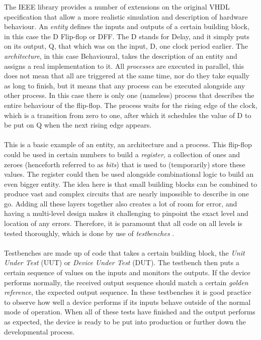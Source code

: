 \documentclass[11pt,british]{article}
\begin{document}
The IEEE library provides a number of extensions on the original VHDL specification that allow a more realistic simulation and description of hardware behaviour. An \emph{entity} defines the inputs and outputs of a certain building block, in this case the D Flip-flop or DFF. The D stands for Delay, and it simply puts on its output, Q, that which was on the input, D, one clock period earlier. The \emph{architecture}, in this case Behavioural, takes the description of an entity and assigns a real implementation to it. All \emph{processes} are executed in parallel, this does not mean that all are triggered at the same time, nor do they take equally as long to finish, but it means that any process can be executed alongside any other process. In this case there is only one (nameless) process that describes the entire behaviour of the flip-flop. The process waits for the rising edge of the clock, which is a transition from zero to one, after which it schedules the value of D to be put on Q when the next rising edge appears.
\\
\\
This is a basic example of an entity, an architecture and a process. This flip-flop could be used in certain numbers to build a \emph{register}, a collection of ones and zeroes (henceforth referred to as \emph{bits}) that is used to (temporarily) store these values. The register could then be used alongside combinational logic to build an even bigger entity. The idea here is that small building blocks can be combined to produce vast and complex circuits that are nearly impossible to describe in one go. Adding all these layers together also creates a lot of room for error, and having a multi-level design makes it challenging to pinpoint the exact level and location of any errors. Therefore, it is paramount that all code on all levels is tested thoroughly, which is done by use of \emph{testbenches} \cite{key-2}.
\\
\\
Testbenches are made up of code that takes a certain building block, the \emph{Unit Under Test} (UUT) or \emph{Device Under Test} (DUT). The testbench then puts a certain sequence of values on the inputs and monitors the outputs. If the device performs normally, the received output sequence should match a certain \emph{golden reference}, the expected output sequence. In these testbenches it is good practice to observe how well a device performs if its inputs behave outside of the normal mode of operation. When all of these tests have finished and the output performs as expected, the device is ready to be put into production or further down the developmental process.
\end{document}
